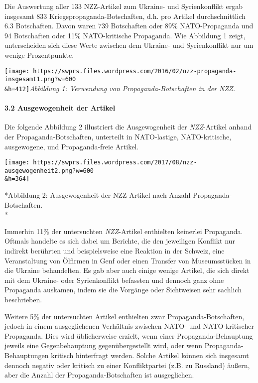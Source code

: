 Die Auswertung aller 133 NZZ-Artikel zum Ukraine- und Syrienkonflikt
ergab insgesamt 833 Kriegspropaganda-Botschaften, d.h. pro Artikel
durchschnittlich 6.3 Botschaften. Davon waren 739 Botschaften oder 89\%
NATO-Propaganda und 94 Botschaften oder 11\% NATO-kritische Propaganda.
Wie Abbildung 1 zeigt, unterscheiden sich diese Werte zwischen dem
Ukraine- und Syrienkonflikt nur um wenige Prozentpunkte.

\texttt{[image: https://swprs.files.wordpress.com/2016/02/nzz-propaganda-insgesamt1.png?w=600\\\&h=412]}\emph{Abbildung
1: Verwendung von Propaganda-Botschaften in der NZZ.}

\paragraph{}

\hypertarget{32-ausgewogenheit-der-artikel}{%
\paragraph{3.2 Ausgewogenheit der
Artikel}\label{32-ausgewogenheit-der-artikel}}

Die folgende Abbildung 2 illustriert die Ausgewogenheit der
\emph{NZZ}-Artikel anhand der Propaganda-Botschaften, unterteilt in
NATO-lastige, NATO-kritische, ausgewogene, und Propaganda-freie Artikel.

\texttt{[image: https://swprs.files.wordpress.com/2017/08/nzz-ausgewogenheit2.png?w=600\\\&h=364]}

*Abbildung 2: Ausgewogenheit der NZZ-Artikel nach Anzahl
Propaganda-Botschaften.\\
*

Immerhin 11\% der untersuchten \emph{NZZ}-Artikel enthielten keinerlei
Propaganda. Oftmals handelte es sich dabei um Berichte, die den
jeweiligen Konflikt nur indirekt berührten und beispielsweise eine
Reaktion in der Schweiz, eine Veranstaltung von Ölfirmen in Genf oder
einen Transfer von Museumsstücken in die Ukraine behandelten. Es gab
aber auch einige wenige Artikel, die sich direkt mit dem Ukraine- oder
Syrienkonflikt befassten und dennoch ganz ohne Propaganda auskamen,
indem sie die Vorgänge oder Sichtweisen sehr sachlich beschrieben.

Weitere 5\% der untersuchten Artikel enthielten zwar
Propaganda-Botschaften, jedoch in einem ausgeglichenen Verhältnis
zwischen NATO- und NATO-kritischer Propaganda. Dies wird üblicherweise
erzielt, wenn einer Propaganda-Behauptung jeweils eine Gegenbehauptung
gegenübergestellt wird, oder wenn Propaganda-Behauptungen kritisch
hinterfragt werden. Solche Artikel können sich insgesamt dennoch negativ
oder kritisch zu einer Konfliktpartei (z.B. zu Russland) äußern, aber
die Anzahl der Propaganda-Botschaften ist ausgeglichen.

